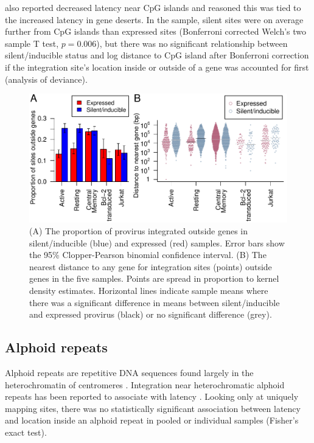 \documentclass[../sherrill-Mix_thesis.tex]{subfiles}
\begin{document}
	\citet{Lewinski2005} also reported decreased latency near CpG islands and reasoned this was tied to the increased latency in gene deserts.  In the \Resting{} sample, silent sites were on average further from CpG islands than expressed sites (Bonferroni corrected Welch's two sample T test, $p=0.006$), but there was no significant relationship between silent/inducible status and log distance to CpG island after Bonferroni correction if the integration site's location inside or outside of a gene was accounted for first (analysis of deviance).

	\begin{figure}
		\centering
			\includegraphics[width=\textwidth]{geneDesert.pdf} %
		\caption[Genes and latency]{(A) The proportion of provirus integrated outside genes in silent/inducible (blue) and expressed (red) samples. Error bars show the 95\% Clopper-Pearson binomial confidence interval. (B) The nearest distance to any gene for integration sites (points) outside genes in the five samples. Points are spread in proportion to kernel density estimates. Horizontal lines indicate sample means where there was a significant difference in means between silent/inducible and expressed provirus (black) or no significant difference (grey).}
		\label{figGeneDeserts}
	\end{figure}

	\subsection{Alphoid repeats} %
		Alphoid repeats are repetitive DNA sequences found largely in the heterochromatin of centromeres \citep{Waye1987}. Integration near heterochromatic alphoid repeats has been reported to associate with latency \citep{Jordan2003,Lewinski2005,Pace2012}. Looking only at uniquely mapping sites, there was no statistically significant association between latency and location inside an alphoid repeat in pooled or individual samples (Fisher's exact test).
\end{document}
